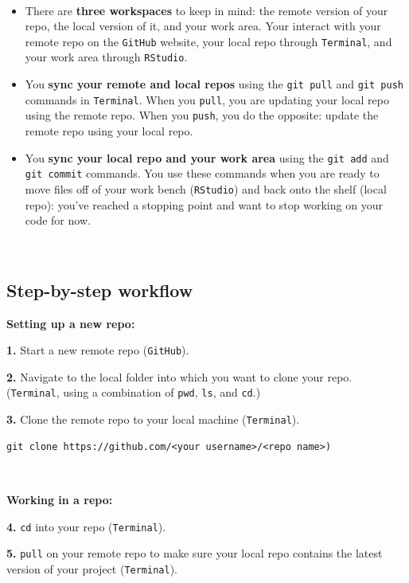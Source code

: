 \documentclass[]{book}
\begin{document}
~

\begin{itemize}
\item
  There are \textbf{three workspaces} to keep in mind: the remote version of your repo, the local version of it, and your work area. Your interact with your remote repo on the \texttt{GitHub} website, your local repo through \texttt{Terminal}, and your work area through \texttt{RStudio}.
\item
  You \textbf{sync your remote and local repos} using the \texttt{git\ pull} and \texttt{git\ push} commands in \texttt{Terminal}. When you \texttt{pull}, you are updating your local repo using the remote repo. When you \texttt{push}, you do the opposite: update the remote repo using your local repo.
\item
  You \textbf{sync your local repo and your work area} using the \texttt{git\ add} and \texttt{git\ commit} commands. You use these commands when you are ready to move files off of your work bench (\texttt{RStudio}) and back onto the shelf (local repo): you've reached a stopping point and want to stop working on your code for now.
\end{itemize}

~

\hypertarget{step-by-step-workflow}{%
\subsection*{Step-by-step workflow}\label{step-by-step-workflow}}

\textbf{Setting up a new repo:}

\textbf{1.} Start a new remote repo (\texttt{GitHub}).

\textbf{2.} Navigate to the local folder into which you want to clone your repo. (\texttt{Terminal}, using a combination of \texttt{pwd}, \texttt{ls}, and \texttt{cd}.)

\textbf{3.} Clone the remote repo to your local machine (\texttt{Terminal}).

\begin{verbatim}
git clone https://github.com/<your username>/<repo name>)  
\end{verbatim}

~

\textbf{Working in a repo:}

\textbf{4.} \texttt{cd} into your repo (\texttt{Terminal}).

\textbf{5.} \texttt{pull} on your remote repo to make sure your local repo contains the latest version of your project (\texttt{Terminal}).
\end{document}
